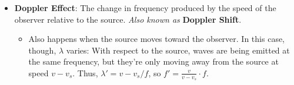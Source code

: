 \documentclass[../notes.tex]{subfiles}
\begin{document}
\begin{itemize}
\begin{itemize}
    \end{itemize}
    \item \textbf{Doppler Effect}: The change in frequency produced by the speed of the observer relative to the source. \emph{Also known as} \textbf{Doppler Shift}.
    \begin{itemize}
        \item Also happens when the source moves toward the observer. In this case, though, $\lambda$ varies: With respect to the source, waves are being emitted at the same frequency, but they're only moving away from the source at speed $v-v_s$. Thus, $\lambda'=v-v_s/f$, so $f'=\frac{v}{v-v_s}\cdot f$.
    \end{itemize}
\end{itemize}
\end{document}
